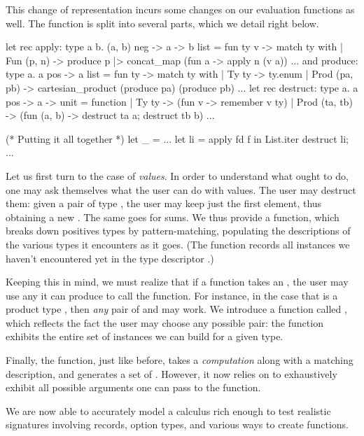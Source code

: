 This change of representation incurs some changes on our evaluation functions
as well. The  function is split into several parts, which we detail
right below.
%
\begin{ocamlcode}
let rec apply: type a b. (a, b) neg -> a -> b list =
  fun ty v -> match ty with
  | Fun (p, n) ->
      produce p |> concat_map (fun a -> apply n (v a))
  ...
and produce: type a. a pos -> a list =
  fun ty -> match ty with
  | Ty ty -> ty.enum
  | Prod (pa, pb) ->
      cartesian_product (produce pa) (produce pb)
  ...
let rec destruct: type a. a pos -> a -> unit =
  function
  | Ty ty -> (fun v ->
      remember v ty)
  | Prod (ta, tb) -> (fun (a, b) ->
      destruct ta a;
      destruct tb b)
  ...

(* Putting it all together *)
let _ =
  ...
  let li = apply fd f in
  List.iter destruct li;
  ...
\end{ocamlcode}
%
Let us first turn to the case of \emph{values}. In order to understand what \arti
ought to do, one may ask themselves what the user can do with values. The user
may destruct them: given a pair of type , the user may keep just
the first element, thus obtaining a new . The same goes for sums. We
thus provide a  function, which breaks down positives types by
pattern-matching, populating the descriptions of the various types it encounters
as it goes. (The  function records all instances we haven't
encountered yet in the type descriptor .)

Keeping this in mind, we must realize that if a function takes an , the
user may use any  it can produce to call the function. For instance, in
the case that  is a product type , then \emph{any} pair
of  and  may work.  We introduce a function called
, which reflects the fact the user may choose any possible pair:
the function exhibits the entire set of instances we can build for a given type.

Finally, the  function, just like before, takes a \emph{computation}
along with a matching description, and generates a set of . However, it
now relies on  to exhaustively exhibit all possible arguments one
can pass to the function.

We are now able to accurately model a calculus rich enough to test realistic
signatures involving records, option types, and various ways to create
functions.

